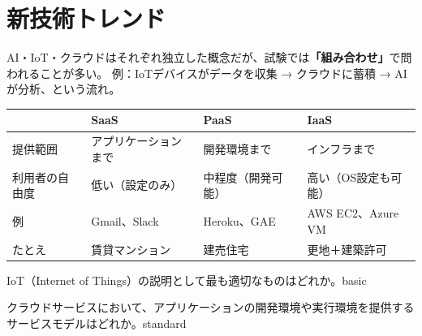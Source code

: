 


\section{新技術トレンド}

\mondaipage
{}

\begin{stumble}
AI・IoT・クラウドはそれぞれ独立した概念だが、試験では\textbf{「組み合わせ」}で問われることが多い。
例：IoTデバイスがデータを収集 → クラウドに蓄積 → AIが分析、という流れ。
\end{stumble}

\begin{comparison}
\begin{tabularx}{\textwidth}{lXXX}
  \toprule
  & \textbf{SaaS} & \textbf{PaaS} & \textbf{IaaS} \\
  \midrule
  提供範囲 & アプリケーションまで & 開発環境まで & インフラまで \\
  利用者の自由度 & 低い（設定のみ） & 中程度（開発可能） & 高い（OS設定も可能） \\
  例 & Gmail、Slack & Heroku、GAE & AWS EC2、Azure VM \\
  たとえ & 賃貸マンション & 建売住宅 & 更地＋建築許可 \\
  \bottomrule
\end{tabularx}
\end{comparison}


\begin{mondai}{IoT（Internet of Things）の説明として最も適切なものはどれか。}{basic}
\end{mondai}

\begin{mondai}{クラウドサービスにおいて、アプリケーションの開発環境や実行環境を提供するサービスモデルはどれか。}{standard}
\end{mondai}


